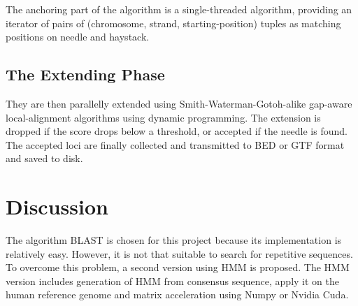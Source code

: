 \documentclass[9pt,final,journal,twocolumn,a4paper]{IEEEtran}
\begin{document}
The anchoring part of the algorithm is a single-threaded algorithm, providing an iterator of pairs of (chromosome, strand, starting-position) tuples as matching positions on needle and haystack.

\subsection{The Extending Phase}

They are then parallelly extended using Smith-Waterman-Gotoh-alike gap-aware local-alignment algorithms using dynamic programming. The extension is dropped if the score drops below a threshold, or accepted if the needle is found. The accepted loci are finally collected and transmitted to BED or GTF format and saved to disk.







\section{Discussion}

The algorithm BLAST is chosen for this project because its implementation is relatively easy. However, it is not that suitable to search for repetitive sequences. To overcome this problem, a second version using HMM is proposed. The HMM version includes generation of HMM from consensus sequence, apply it on the human reference genome and matrix acceleration using Numpy or Nvidia Cuda.
\end{document}
